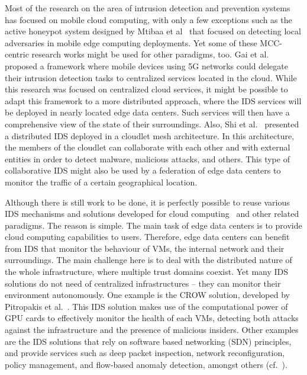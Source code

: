 \documentclass[twocolumn,preprint,3p]{elsarticle}
\begin{document}
Most of the research on the area of intrusion detection and prevention systems has focused on mobile cloud computing, with only a few exceptions such as the active honeypot system designed by Mtibaa et al~\cite{Mtibaa15} that focused on detecting local adversaries in mobile edge computing deployments. Yet some of these MCC-centric research works might be used for other paradigms, too. Gai et al.~\cite{Gai15} proposed a framework where mobile devices using 5G networks could delegate their intrusion detection tasks to centralized services located in the cloud. While this research was focused on centralized cloud services, it might be possible to adapt this framework to a more distributed approach, where the IDS services will be deployed in nearly located edge data centers. Such services will then have a comprehensive view of the state of their surroundings. Also, Shi et al.~\cite{Shi15} presented a distributed IDS deployed in a cloudlet mesh architecture. In this architecture, the members of the cloudlet can collaborate with each other and with external entities in order to detect malware, malicious attacks, and others. This type of collaborative IDS might also be used by a federation of edge data centers to monitor the traffic of a certain geographical location.

Although there is still work to be done, it is perfectly possible to reuse various IDS mechanisms and solutions developed for cloud computing~\cite{Iqbal201698} and other related paradigms. The reason is simple. The main task of edge data centers is to provide cloud computing capabilities to users. Therefore, edge data centers can benefit from IDS that monitor the behaviour of VMs, the internal network and their surroundings. The main challenge here is to deal with the distributed nature of the whole infrastructure, where multiple trust domains coexist. Yet many IDS solutions do not need of centralized infrastructures -- they can monitor their environment autonomously. One example is the CROW solution, developed by Pitropakis et al.~\cite{Pitropakis15}. This IDS solution makes use of the computational power of GPU cards to effectively monitor the health of each VMs, detecting both attacks against the infrastructure and the presence of malicious insiders. Other examples are the IDS solutions that rely on software based networking (SDN) principles, and provide services such as deep packet inspection, network reconfiguration, policy management, and flow-based anomaly detection, amongst others (cf.~\cite{AhmadSDN15}).
\end{document}
